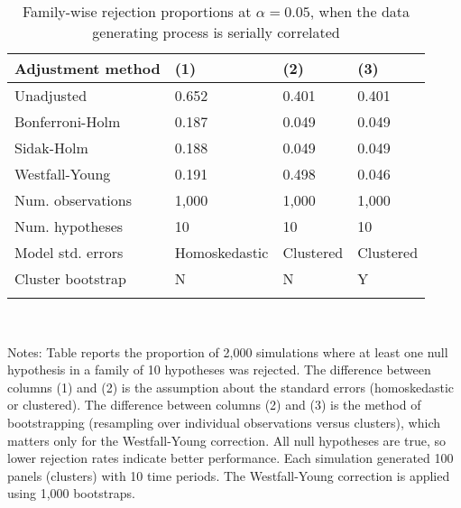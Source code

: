 \documentclass{article}
\begin{document}
\begin{table}[tbp] \centering
{}

\caption{Family-wise rejection proportions at \(\alpha = 0.05\), when the data generating process is serially correlated}
\label{tab:wyoung2}
\begin{tabularx}{\linewidth}{@{}lCCC@{}}

\toprule
{Adjustment method}&{(1)}&{(2)}&{(3)} \tabularnewline
\midrule \addlinespace[\belowrulesep]
Unadjusted&0.652&0.401&0.401 \tabularnewline
Bonferroni-Holm&0.187&0.049&0.049 \tabularnewline
Sidak-Holm&0.188&0.049&0.049 \tabularnewline
Westfall-Young&0.191&0.498&0.046 \tabularnewline
\midrule Num. observations&1,000&1,000&1,000 \tabularnewline
Num. hypotheses&10&10&10 \tabularnewline
Model std. errors&Homoskedastic&Clustered&Clustered \tabularnewline
Cluster bootstrap&N&N&Y \tabularnewline
\bottomrule \addlinespace[\belowrulesep]

\end{tabularx}
\\ \parbox{\linewidth}{\footnotesize Notes: Table reports the proportion of 2,000 simulations where at least one null hypothesis in a family of 10 hypotheses was rejected. The difference between columns (1) and (2) is the assumption about the standard errors (homoskedastic or clustered). The difference between columns (2) and (3) is the method of bootstrapping (resampling over individual observations versus clusters), which matters only for the Westfall-Young correction. All null hypotheses are true, so lower rejection rates indicate better performance. Each simulation generated 100 panels (clusters) with 10 time periods. The Westfall-Young correction is applied using 1,000 bootstraps.}
\end{table}
\end{document}

